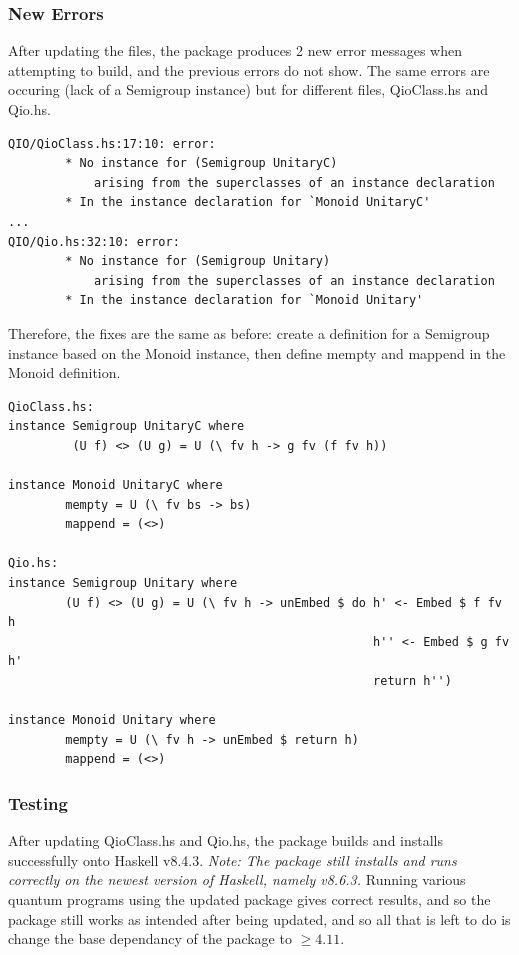 \documentclass[a4paper,10pt, titlepage, twoside]{article}
\begin{document}
\subsubsection{New Errors}
After updating the files, the package produces 2 new error messages when attempting to build, and the previous errors do not show. The same errors are occuring (lack of a Semigroup instance) but for different files, QioClass.hs and Qio.hs.
\begin{verbatim}
QIO/QioClass.hs:17:10: error:
        * No instance for (Semigroup UnitaryC)
            arising from the superclasses of an instance declaration
        * In the instance declaration for `Monoid UnitaryC'
...
QIO/Qio.hs:32:10: error:
        * No instance for (Semigroup Unitary)
            arising from the superclasses of an instance declaration
        * In the instance declaration for `Monoid Unitary'
\end{verbatim}
Therefore, the fixes are the same as before: create a definition for a Semigroup instance based on the Monoid instance, then define mempty and mappend in the Monoid definition.
\begin{verbatim}
QioClass.hs:
instance Semigroup UnitaryC where
         (U f) <> (U g) = U (\ fv h -> g fv (f fv h))
        
instance Monoid UnitaryC where
        mempty = U (\ fv bs -> bs)
        mappend = (<>)

Qio.hs:
instance Semigroup Unitary where
        (U f) <> (U g) = U (\ fv h -> unEmbed $ do h' <- Embed $ f fv h
                                                   h'' <- Embed $ g fv h'
                                                   return h'')
                                                
instance Monoid Unitary where
        mempty = U (\ fv h -> unEmbed $ return h)
        mappend = (<>)
\end{verbatim}

\subsubsection{Testing}
After updating QioClass.hs and Qio.hs, the package builds and installs successfully onto Haskell v8.4.3. \textit{Note: The package still installs and runs correctly on the newest version of Haskell, namely v8.6.3.} Running various quantum programs using the updated package gives correct results, and so the package still works as intended after being updated, and so all that is left to do is change the base dependancy of the package to $\geq 4.11$.
\end{document}
